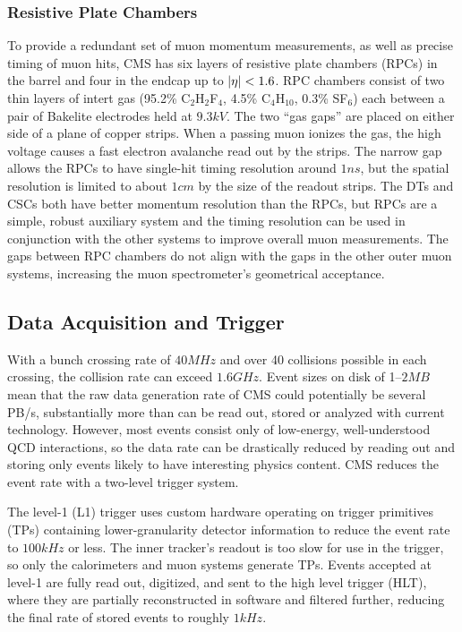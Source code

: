 \subsubsection{Resistive Plate Chambers}
To provide a redundant set of muon momentum measurements, as well as precise timing of muon hits, CMS has six layers of resistive plate chambers (RPCs) in the barrel and four in the endcap up to $\lvert \eta \rvert < 1.6$.
RPC chambers consist of two thin layers of intert gas (95.2\% C$_2$H$_2$F$_4$, 4.5\% C$_4$H$_{10}$, 0.3\% SF$_6$) each between a pair of Bakelite electrodes held at $9.3\unit{kV}$.
The two ``gas gaps'' are placed on either side of a plane of copper strips.
When a passing muon ionizes the gas, the high voltage causes a fast electron avalanche read out by the strips.
The narrow gap allows the RPCs to have single-hit timing resolution around $1\unit{ns}$, but the spatial resolution is limited to about $1\unit{cm}$ by the size of the readout strips.
The DTs and CSCs both have better momentum resolution than the RPCs, but RPCs are a simple, robust auxiliary system and the timing resolution can be used in conjunction with the other systems to improve overall muon measurements.
The gaps between RPC chambers do not align with the gaps in the other outer muon systems, increasing the muon spectrometer's geometrical acceptance.


\subsection{Data Acquisition and Trigger}
With a bunch crossing rate of $40\unit{MHz}$ and over 40 collisions possible in each crossing, the collision rate can exceed $1.6\unit{GHz}$.
Event sizes on disk of 1--$2\unit{MB}$ mean that the raw data generation rate of CMS could potentially be several PB/s, substantially more than can be read out, stored or analyzed with current technology.
However, most events consist only of low-energy, well-understood QCD interactions, so the data rate can be drastically reduced by reading out and storing only events likely to have interesting physics content.
CMS reduces the event rate with a two-level trigger system.

The level-1 (L1) trigger uses custom hardware operating on trigger primitives (TPs) containing lower-granularity detector information to reduce the event rate to $100\unit{kHz}$ or less.
The inner tracker's readout is too slow for use in the trigger, so only the calorimeters and muon systems generate TPs.
Events accepted at level-1 are fully read out, digitized, and sent to the high level trigger (HLT), where they are partially reconstructed in software and filtered further, reducing the final rate of stored events to roughly $1\unit{kHz}$.


